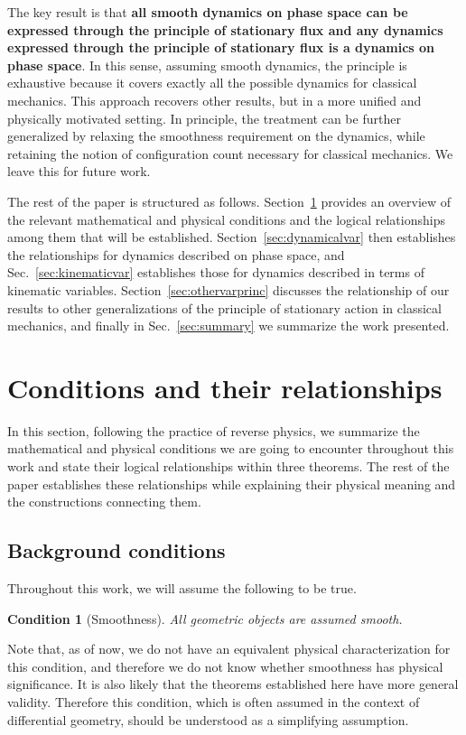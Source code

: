 \documentclass[nofootinbib,aps,pre]{revtex4-2}
\newtheorem{condth}{Condition}
\renewcommand*{\thecondth}{\Roman{condth}}
\newenvironment{condition}[2][]{\renewcommand{\thecondth}{#2}\begin{condth}[#1]\label{#2}}{\end{condth}\renewcommand{\thecondth}{\Roman{condth}}}
\begin{document}
The key result is that \textbf{all smooth dynamics on phase space can be expressed through the principle of stationary flux and any dynamics expressed through the principle of stationary flux is a dynamics on phase space}. In this sense, assuming smooth dynamics, the principle is exhaustive because it covers exactly all the possible dynamics for classical mechanics. This approach recovers other results, but in a more unified and physically motivated setting. In principle, the treatment can be further generalized by relaxing the  smoothness requirement on the dynamics, while retaining the notion of configuration count necessary for classical mechanics. We leave this for future work.

The rest of the paper is structured as follows.  Section~\ref{sec:conditions} provides an overview of the relevant mathematical and physical conditions and the logical relationships among them that will be established.  Section~\ref{sec:dynamicalvar} then establishes the relationships for dynamics described on phase space, and Sec.~\ref{sec:kinematicvar} establishes those for dynamics described in terms of kinematic variables. Section~\ref{sec:othervarprinc} discusses the relationship of our results to other generalizations of the principle of stationary action in classical mechanics, and finally in Sec.~\ref{sec:summary} we summarize the work presented.



\section{Conditions and their relationships}
\label{sec:conditions}

In this section, following the practice of reverse physics, we summarize the mathematical and physical conditions we are going to encounter throughout this work and state their logical relationships within three theorems. The rest of the paper establishes these relationships while explaining their physical meaning and the constructions connecting them.  

\subsection{Background conditions}

Throughout this work, we will assume the following to be true.
\begin{condition}[Smoothness]{SM}
	All geometric objects are assumed smooth.
\end{condition}
Note that, as of now, we do not have an equivalent physical characterization for this condition, and therefore we do not know whether smoothness has physical significance. It is also likely that the theorems established here have more general validity. Therefore this condition, which is often assumed in the context of differential geometry, should be understood as a simplifying assumption.
\end{document}
